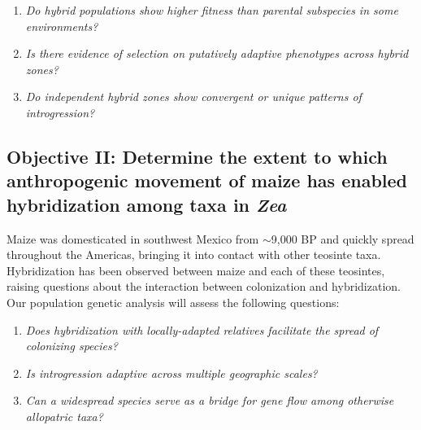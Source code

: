 \begin{enumerate}
\item \emph{Do hybrid populations show higher fitness than parental subspecies in some environments?}

\item \emph{Is there evidence of selection on putatively adaptive phenotypes across hybrid zones?} 

\item \emph{Do independent hybrid zones show convergent or unique patterns of introgression?}
\end{enumerate}
\subsection*{Objective II: Determine the extent to which anthropogenic movement of maize has enabled hybridization among taxa in \emph{Zea}}
Maize was domesticated in southwest Mexico from \zp{} $\sim$9,000 BP \citep{Matsuoka2002} and quickly spread throughout the Americas, bringing it into contact with other teosinte taxa.
Hybridization has been observed between maize and each of these teosintes, raising questions about the interaction between colonization and hybridization. 
Our population genetic analysis will assess the following questions:
\begin{enumerate}
\item \emph{Does hybridization with locally-adapted relatives facilitate the spread of colonizing species?}
\item \emph{Is introgression adaptive across multiple geographic scales?}
\item \emph{Can a widespread species serve as a bridge for gene flow among otherwise allopatric taxa?} 
\end{enumerate}

